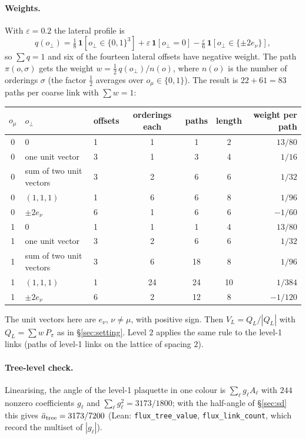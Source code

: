 \documentclass[11pt,a4paper]{article}
\theoremstyle{definition}
\theoremstyle{remark}
\newcommand{\code}[1]{\texttt{#1}}
\newcommand{\abar}{\bar a}
\begin{document}
\paragraph{Weights.} With $\varepsilon=0.2$ the lateral profile is
\[
q(o_\perp)=\tfrac18\,\mathbf 1[o_\perp\in\{0,1\}^3]+\varepsilon\,\mathbf 1[o_\perp=0]-\tfrac{\varepsilon}{6}\,\mathbf 1[o_\perp\in\{\pm2e_\nu\}],
\]
so $\sum q=1$ and six of the fourteen lateral offsets have negative weight. The path $\pi(o,\sigma)$ gets the weight $w=\frac12\,q(o_\perp)/n(o)$, where $n(o)$ is the number of orderings $\sigma$ (the factor $\frac12$ averages over $o_\mu\in\{0,1\}$). The result is $22+61=83$ paths per coarse link with $\sum w=1$:

\begin{center}\small
\begin{tabular}{@{}cllcccr@{}}\toprule
$o_\mu$ & $o_\perp$ & offsets & orderings each & paths & length & weight per path\\\midrule
0 & $0$ & 1 & 1 & 1 & 2 & $13/80$\\
0 & one unit vector & 3 & 1 & 3 & 4 & $1/16$\\
0 & sum of two unit vectors & 3 & 2 & 6 & 6 & $1/32$\\
0 & $(1,1,1)$ & 1 & 6 & 6 & 8 & $1/96$\\
0 & $\pm2e_\nu$ & 6 & 1 & 6 & 6 & $-1/60$\\\midrule
1 & $0$ & 1 & 1 & 1 & 4 & $13/80$\\
1 & one unit vector & 3 & 2 & 6 & 6 & $1/32$\\
1 & sum of two unit vectors & 3 & 6 & 18 & 8 & $1/96$\\
1 & $(1,1,1)$ & 1 & 24 & 24 & 10 & $1/384$\\
1 & $\pm2e_\nu$ & 6 & 2 & 12 & 8 & $-1/120$\\\bottomrule
\end{tabular}
\end{center}

\noindent The unit vectors here are $e_\nu$, $\nu\ne\mu$, with positive sign. Then $V_L=Q_L/|Q_L|$ with $Q_L=\sum w\,P_{\pi}$ as in \S\ref{sec:setting}. Level $2$ applies the same rule to the level-1 links (paths of level-1 links on the lattice of spacing $2$).

\paragraph{Tree-level check.} Linearising, the angle of the level-1 plaquette in one colour is $\sum_\ell g_\ell A_\ell$ with $244$ nonzero coefficients $g_\ell$ and $\sum_\ell g_\ell^2=3173/1800$; with the half-angle of \S\ref{sec:sd} this gives $\abar_{\rm tree}=3173/7200$ (Lean: \code{flux\_tree\_value}, \code{flux\_link\_count}, which record the multiset of $|g_\ell|$).
\end{document}
